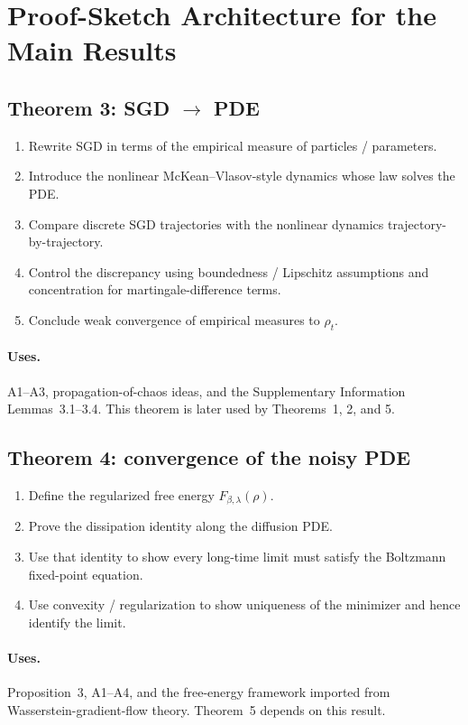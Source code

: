 \section{Proof-Sketch Architecture for the Main Results}

\subsection*{Theorem 3: SGD $\to$ PDE}
\begin{enumerate}[label=\arabic*.]
\item Rewrite SGD in terms of the empirical measure of particles / parameters.
\item Introduce the nonlinear McKean--Vlasov-style dynamics whose law solves the PDE.
\item Compare discrete SGD trajectories with the nonlinear dynamics trajectory-by-trajectory.
\item Control the discrepancy using boundedness / Lipschitz assumptions and concentration for martingale-difference terms.
\item Conclude weak convergence of empirical measures to $\rho_t$.
\end{enumerate}
\paragraph{Uses.}
A1--A3, propagation-of-chaos ideas, and the Supplementary Information Lemmas~3.1--3.4. This theorem is later used by Theorems~1, 2, and 5.

\subsection*{Theorem 4: convergence of the noisy PDE}
\begin{enumerate}[label=\arabic*.]
\item Define the regularized free energy $F_{\beta,\lambda}(\rho)$.
\item Prove the dissipation identity along the diffusion PDE.
\item Use that identity to show every long-time limit must satisfy the Boltzmann fixed-point equation.
\item Use convexity / regularization to show uniqueness of the minimizer and hence identify the limit.
\end{enumerate}
\paragraph{Uses.}
Proposition~3, A1--A4, and the free-energy framework imported from Wasserstein-gradient-flow theory. Theorem~5 depends on this result.

